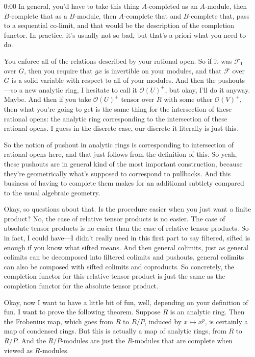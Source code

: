 \begin{unfinished}{0:00}
In general, you'd have to take this thing $A$-completed as an $A$-module, then $B$-complete that as a $B$-module, then $A$-complete that and $B$-complete that, pass to a sequential co-limit, and that would be the description of the completion functor. In practice, it's usually not so bad, but that's a priori what you need to do.

You enforce all of the relations described by your rational open. So if it was $\mathcal{F}_{1}$ over $G$, then you require that $gx$ is invertible on your modules, and that $\mathcal{F}$ over $G$ is a solid variable with respect to all of your modules. And then the pushouts---so a new analytic ring, I hesitate to call it $\mathcal{O}(U)^{+}$, but okay, I'll do it anyway. Maybe. And then if you take $\mathcal{O}(U)^{+}$ tensor over $R$ with some other $\mathcal{O}(V)^{+}$, then what you're going to get is the same thing for the intersection of these rational opens: the analytic ring corresponding to the intersection of these rational opens. I guess in the discrete case, our discrete it literally is just this. 

So the notion of pushout in analytic rings is corresponding to intersection of rational opens here, and that just follows from the definition of this. So yeah, these pushouts are in general kind of the most important construction, because they're geometrically what's supposed to correspond to pullbacks. And this business of having to complete them makes for an additional subtlety compared to the usual algebraic geometry.

Okay, so questions about that. Is the procedure easier when you just want a finite product? No, the case of relative tensor products is no easier. The case of absolute tensor products is no easier than the case of relative tensor products. So in fact, I could have---I didn't really need in this first part to say filtered, sifted is enough if you know what sifted means. And then general colimits, just as general colimits can be decomposed into filtered colimits and pushouts, general colimits can also be composed with sifted colimits and coproducts. So concretely, the completion functor for this relative tensor product is just the same as the completion functor for the absolute tensor product.

Okay, now I want to have a little bit of fun, well, depending on your definition of fun. I want to prove the following theorem. Suppose $R$ is an analytic ring. Then the Frobenius map, which goes from $R$ to $R/P$, induced by $x \mapsto x^p$, is certainly a map of condensed rings. But this is actually a map of analytic rings, from $R$ to $R/P$. And the $R/P$-modules are just the $R$-modules that are complete when viewed as $R$-modules.


\end{unfinished}
